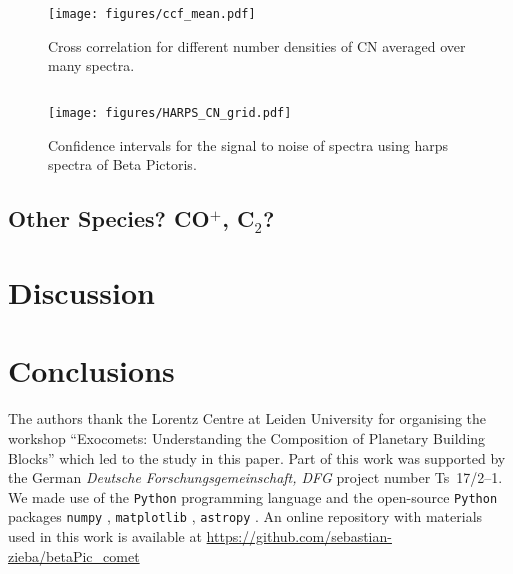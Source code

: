 \documentclass{aa}
\newcommand{\bp}{Beta Pictoris}
\begin{document}
\begin{figure}
    \begin{centering}
        \texttt{[image: figures/ccf\_mean.pdf]}
        \caption{Cross correlation for different number densities of CN averaged over many spectra.}
        \label{fig:ccf}
    \end{centering}
\end{figure}




\subsection{}

\begin{figure}
    \begin{centering}
        \texttt{[image: figures/HARPS\_CN\_grid.pdf]}
        \caption{Confidence intervals for the signal to noise of  spectra using \ac{harps} spectra of \bp{}.}
        \label{fig:HARPS_CN_grid}
    \end{centering}
\end{figure}



\subsection{Other Species? CO$^+$, C$_2$?}




\section{Discussion}

\section{Conclusions}


\begin{acknowledgements}

      The authors thank the Lorentz Centre at Leiden University for organising the workshop ``Exocomets: Understanding the Composition of Planetary Building Blocks'' which led to the study in this paper. 
%
      Part of this work was supported by the German
      \emph{Deut\-sche For\-schungs\-ge\-mein\-schaft, DFG\/} project
      number Ts~17/2--1.
We made use of the {\tt Python} programming language \citep{rossum1995} and the open-source {\tt Python} packages {\tt numpy} \citep{walt2011}, {\tt matplotlib} \citep{hunter2007}, {\tt astropy} \citep{astropy2013}.
%      
An online repository with materials used in this work is available at \url{https://github.com/sebastian-zieba/betaPic_comet}
\end{acknowledgements}
\end{document}
